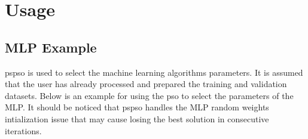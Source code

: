 \documentclass[letterpaper,10pt,english]{sphinxmanual}
\begin{document}
\chapter{Usage}
\label{\detokenize{index:usage}}

\section{MLP Example}
\label{\detokenize{index:mlp-example}}
pspso is used to select the machine learning algorithms parameters. It
is assumed that the user has already processed and prepared the training
and validation datasets. Below is an example for using the pso to select
the parameters of the MLP. It should be noticed that pspso handles the
MLP random weights intialization issue that may cause losing the best
solution in consecutive iterations.
\end{document}
